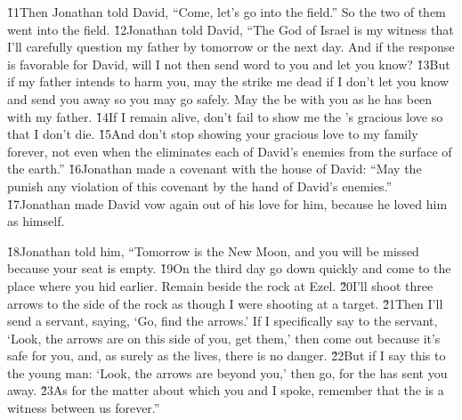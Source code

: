 \v{11}Then Jonathan told David, ``Come, let's go into the field.'' So the two of them went into the field. \v{12}Jonathan told David, ``The  God of Israel is my witness that I'll carefully question my father by tomorrow or the next day. And if the response is favorable for David, will I not then send word to you and let you know? \v{13}But if my father intends to harm you, may the  strike me dead if I don't let you know and send you away so you may go safely. May the  be with you as he has been with my father. \v{14}If I remain alive, don't fail to show me the 's gracious love so that I don't die. \v{15}And don't stop showing your gracious love to my family forever, not even when the  eliminates each of David's enemies from the surface of the earth.'' \v{16}Jonathan made a covenant with the house of David: ``May the  punish any violation of this covenant by the hand of David's enemies.'' \v{17}Jonathan made David vow again out of his love for him, because he loved him as himself.

\v{18}Jonathan told him, ``Tomorrow is the New Moon, and you will be missed because your seat is empty. \v{19}On the third day go down quickly and come to the place where you hid earlier. Remain beside the rock at Ezel. \v{20}I'll shoot three arrows to the side of the rock as though I were shooting at a target. \v{21}Then I'll send a servant, saying, `Go, find the arrows.' If I specifically say to the servant, `Look, the arrows are on this side of you, get them,' then come out because it's safe for you, and, as surely as the  lives, there is no danger. \v{22}But if I say this to the young man: `Look, the arrows are beyond you,' then go, for the  has sent you away. \v{23}As for the matter about which you and I spoke, remember that the  is a witness between us forever.''

